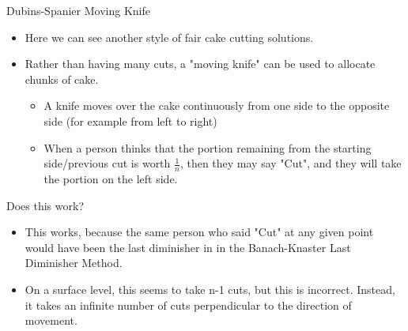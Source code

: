 \documentclass[t]{beamer}
\newcommand{\ite}{\item[\ding{118}]}
\begin{document}
\begin{frame}{Dubins-Spanier Moving Knife}
	\begin{itemize}
		\ite Here we can see another style of fair cake cutting solutions.
		\ite Rather than having many cuts, a "moving knife" can be used to allocate chunks of cake.
		\begin{itemize}
			\ite A knife moves over the cake continuously from one side to the opposite side (for example from left to right)
			\ite When a person thinks that the portion remaining from the starting side/previous cut is worth $\frac{1}{n}$, then they may say "Cut", and they will take the portion on the left side.
		\end{itemize}
	\end{itemize}
\end{frame}

\begin{frame}{Does this work?}
	\begin{itemize}
		\ite This works, because the same person who said "Cut" at any given point would have been the last diminisher in in the Banach-Knaster Last Diminisher Method.
		\ite On a surface level, this seems to take n-1 cuts, but this is incorrect. Instead, it takes an infinite number of cuts perpendicular to the direction of movement.
	\end{itemize}
\end{frame}
\end{document}
